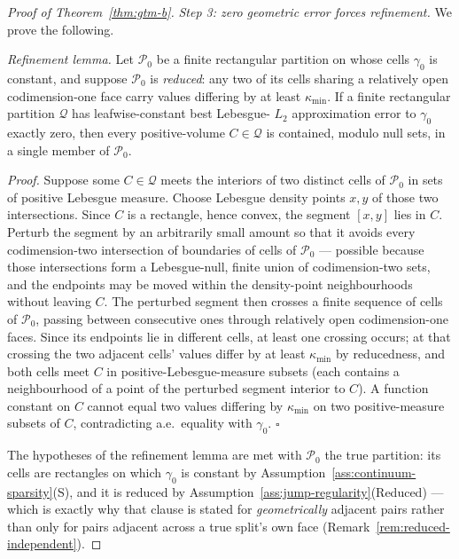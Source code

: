 \documentclass[11pt]{article}
\theoremstyle{plain}
\theoremstyle{definition}
\theoremstyle{remark}
\begin{document}
\begin{proof}[Proof of Theorem~\ref{thm:gtm-b}]
\emph{Step 3: zero geometric error forces refinement.}
We prove the following.

\emph{Refinement lemma.} Let \(\mathcal{P}_0\) be a finite rectangular partition on
whose cells \(\gamma_0\) is constant, and suppose \(\mathcal{P}_0\) is
\emph{reduced}: any two of its cells sharing a relatively open
codimension-one face carry values differing by at least \(\kappa_{\min}\). If
a finite rectangular partition \(\mathcal{Q}\) has leafwise-constant best Lebesgue-%
\(L_2\) approximation error to \(\gamma_0\) exactly zero, then every
positive-volume \(C\in\mathcal{Q}\) is contained, modulo null sets, in a single member
of \(\mathcal{P}_0\).

\emph{Proof.} Suppose some \(C\in\mathcal{Q}\) meets the interiors of two distinct
cells of \(\mathcal{P}_0\) in sets of positive Lebesgue measure. Choose Lebesgue
density points \(x,y\) of those two intersections. Since \(C\) is a rectangle,
hence convex, the segment \([x,y]\) lies in \(C\). Perturb the segment by an
arbitrarily small amount so that it avoids every codimension-two intersection
of boundaries of cells of \(\mathcal{P}_0\) --- possible because those intersections
form a Lebesgue-null, finite union of codimension-two sets, and the endpoints
may be moved within the density-point neighbourhoods without leaving \(C\).
The perturbed segment then crosses a finite sequence of cells of \(\mathcal{P}_0\),
passing between consecutive ones through relatively open codimension-one
faces. Since its endpoints lie in different cells, at least one crossing
occurs; at that crossing the two adjacent cells' values differ by at least
\(\kappa_{\min}\) by reducedness, and both cells meet \(C\) in
positive-Lebesgue-measure subsets (each contains a neighbourhood of a point of
the perturbed segment interior to \(C\)). A function constant on \(C\) cannot
equal two values differing by \(\kappa_{\min}\) on two positive-measure
subsets of \(C\), contradicting a.e.\ equality with \(\gamma_0\). \(\square\)

The hypotheses of the refinement lemma are met with \(\mathcal{P}_0\) the true
partition: its cells are rectangles on which \(\gamma_0\) is constant by
Assumption~\ref{ass:continuum-sparsity}(S), and it is reduced by
Assumption~\ref{ass:jump-regularity}(Reduced) --- which is exactly why that
clause is stated for \emph{geometrically} adjacent pairs rather than only for
pairs adjacent across a true split's own face
(Remark~\ref{rem:reduced-independent}).


\end{proof}
\end{document}
